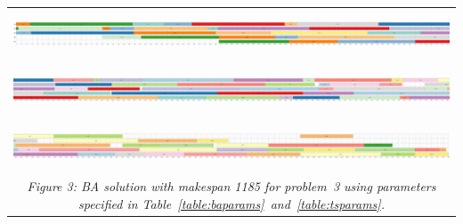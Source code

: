 \documentclass[paper=a4, fontsize=9pt]{scrartcl}
\begin{document}
\begin{landscape}
{\begin{table}
\begin{tabular}{l}
\includegraphics[height=40pt]{figures/solution_ba_instance_3_1_scaled}\\[0.15cm]
\hspace{0.90909pt}\includegraphics[height=40pt]{figures/solution_ba_instance_3_2_scaled}\\[0.15cm]
\hspace{0.90909pt}\includegraphics[height=40pt]{figures/solution_ba_instance_3_3_scaled}\\
\multicolumn{1}{c}{\textit{Figure 3: \acf{BA} solution with makespan 1185 for problem~3 using parameters specified in Table~\ref{table:baparams}~and~\ref{table:tsparams}.}}\\
\end{tabular}
\end{table}
}
\end{landscape}
\end{document}
